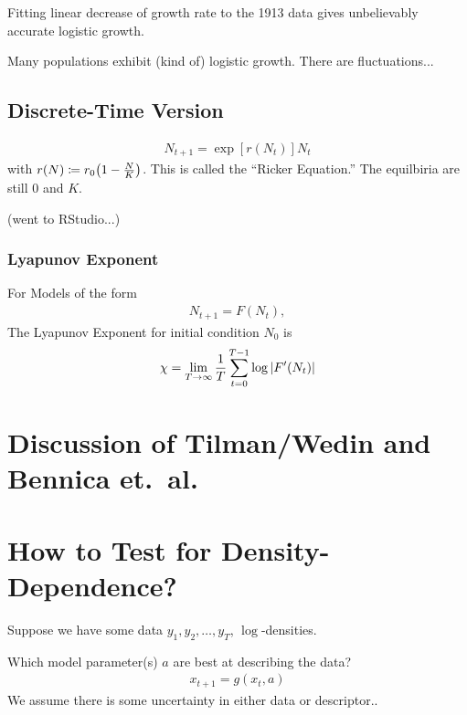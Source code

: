 \documentclass{article}
\begin{document}
    Fitting linear decrease of growth rate to the 1913 data gives unbelievably accurate logistic growth.

    Many populations exhibit (kind of) logistic growth.  There are fluctuations...

    \subsection{Discrete-Time Version}
    \begin{align*}
        N_{t+1} = \exp[r(N_t)]N_t
    \end{align*}
    with $r(N) \coloneqq r_0\qty(1 - \frac{N}{K})$.  This is called the ``Ricker Equation.''
    The equilbiria are still $0$ and $K$.

    (went to RStudio...)

    \subsubsection{Lyapunov Exponent}

    For Models of the form
    \begin{align}
        N_{t+1} = F(N_t),
    \end{align}
    The Lyapunov Exponent for initial condition $N_0$ is
    \begin{align}
        \chi = \lim_{T\rightarrow\infty} \frac{1}{T}\sum_{t=0}^{T-1}\log\abs{F'(N_t)}
    \end{align}

    \section{Discussion of Tilman/Wedin and Bennica et.~al.}

    \section{How to Test for Density-Dependence?}

    Suppose we have some data $y_1, y_2, \dots, y_T$, $\log$-densities.

    Which model parameter(s) $a$ are best at describing the data?
    \begin{align}
        x_{t+1} = g(x_t, a)
    \end{align}
    We assume there is some uncertainty in either data or descriptor..
\end{document}
